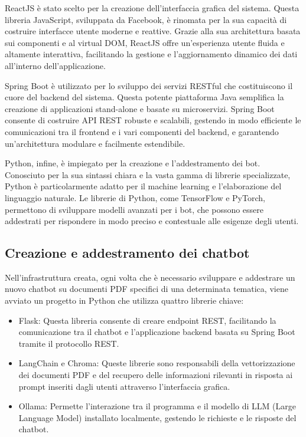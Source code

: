 \documentclass[a4paper,twoside,12pt]{toptesi}
\begin{document}
ReactJS è stato scelto per la creazione dell'interfaccia grafica del sistema. Questa libreria JavaScript, sviluppata da Facebook, è rinomata per la sua capacità di costruire interfacce utente moderne e reattive. Grazie alla sua architettura basata sui componenti e al virtual DOM, ReactJS offre un'esperienza utente fluida e altamente interattiva, facilitando la gestione e l'aggiornamento dinamico dei dati all'interno dell'applicazione.

Spring Boot è utilizzato per lo sviluppo dei servizi RESTful che costituiscono il cuore del backend del sistema. Questa potente piattaforma Java semplifica la creazione di applicazioni stand-alone e basate su microservizi. Spring Boot consente di costruire API REST robuste e scalabili, gestendo in modo efficiente le comunicazioni tra il frontend e i vari componenti del backend, e garantendo un'architettura modulare e facilmente estendibile.

Python, infine, è impiegato per la creazione e l'addestramento dei bot. Conosciuto per la sua sintassi chiara e la vasta gamma di librerie specializzate, Python è particolarmente adatto per il machine learning e l'elaborazione del linguaggio naturale. Le librerie di Python, come TensorFlow e PyTorch, permettono di sviluppare modelli avanzati per i bot, che possono essere addestrati per rispondere in modo preciso e contestuale alle esigenze degli utenti.

\subsection{Creazione e addestramento dei chatbot}

Nell'infrastruttura creata, ogni volta che è necessario sviluppare e addestrare un nuovo chatbot su documenti PDF specifici di una determinata tematica, viene avviato un progetto in Python che utilizza quattro librerie chiave:

\begin{itemize}
	\item Flask: Questa libreria consente di creare endpoint REST, facilitando la comunicazione tra il chatbot e l'applicazione backend basata su Spring Boot tramite il protocollo REST.
	\item LangChain e Chroma: Queste librerie sono responsabili della vettorizzazione dei documenti PDF e del recupero delle informazioni rilevanti in risposta ai prompt inseriti dagli utenti attraverso l'interfaccia grafica.
	\item Ollama: Permette l'interazione tra il programma e il modello di LLM (Large Language Model) installato localmente, gestendo le richieste e le risposte del chatbot.
\end{itemize}
\end{document}
